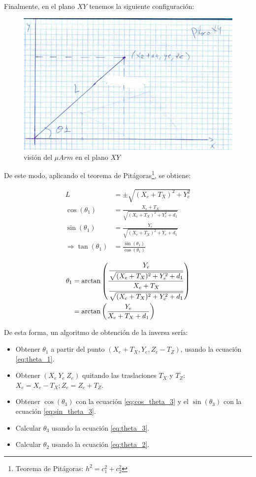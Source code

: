 \documentclass[a4paper,12pt]{article}
\begin{document}
Finalmente, en el plano $XY$ tenemos la siguiente configuración:

\begin{figure}[H]
    \centering
    \includegraphics[width=.8\linewidth]{images/ik_xy_ok.png}
    \caption{visión del $\mu Arm$ en el plano $XY$}
    \label{fig:uarm_xy_ok}
\end{figure}

De este modo, aplicando el teorema de Pitágoras\footnote
{Teorema de Pitágoras: $h^2 = c_1^2 + c_2^2$}, se obtiene:

\begin{align*}
    L                              & = \pm \sqrt{(X_e + T_X)^2 + Y_e^2}                     \\
    \cos(\theta_1)                 & = \frac{X_e + T_X}{\sqrt{(X_e + T_X)^2 + Y_e^2 + d_1}} \\
    \sin(\theta_1)                 & = \frac{Y_e}{\sqrt{(X_e + T_X)^2 + Y_e + d_1}}         \\
    \Longrightarrow \tan(\theta_1) & = \frac{\sin(\theta_1)}{\cos(\theta_1)}                \\
\end{align*}
\begin{align}
    \theta_1 & = \arctan\left(\frac{\cfrac{Y_e}{\sqrt{(X_e + T_X)^2 + Y_e^2 + d_1}}}{\cfrac{X_e + T_X}{\sqrt{(X_e + T_X)^2 + Y_e^2 + d_1}}}\right) \\
             & = \arctan\left(\frac{Y_e}{X_e + T_X + d_1}\right) \label{eq:theta_1}                                                                \\
\end{align}

De esta forma, un algoritmo de obtención de la inversa sería:

\begin{itemize}
    \item Obtener $\theta_1$ a partir del punto $(X_e + T_X, Y_e, Z_e - T_Z)$, usando la ecuación \ref{eq:theta_1}.
    \item Obtener $(X_e ~ Y_e ~ Z_e)$ quitando las traslaciones $T_X$ y $T_Z$: $X_e = X_e - T_X; Z_e = Z_e + T_Z$.
    \item Obtener $\cos(\theta_3)$ con la ecuación \ref{eq:cos_theta_3} y el $\sin(\theta_3)$ con la ecuación \ref{eq:sin_theta_3}.
    \item Calcular $\theta_3$ usando la ecuación \ref{eq:theta_3}.
    \item Calcular $\theta_2$ usando la ecuación \ref{eq:theta_2}.
\end{itemize}
\end{document}
